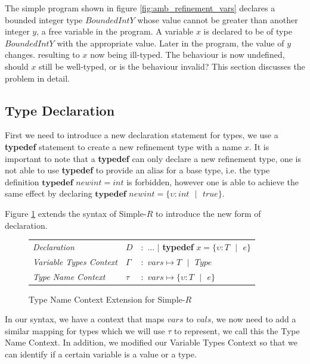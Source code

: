 \documentclass[a4paper,12pt]{report}
\begin{document}
\par
The simple program shown in figure \ref{fig:amb_refinement_vars} declares a 
bounded integer type $BoundedIntY$ whose value cannot be greater than another integer $y$, 
a free variable in the program. A variable $x$ is declared to be of type 
$BoundedIntY$ with the appropriate value. Later in the program, the value of $y$ 
changes. resulting to $x$ now being ill-typed. The behaviour is now undefined, 
should $x$ still be well-typed, or is the behaviour invalid? This section 
discusses the problem in detail. 

\subsection{Type Declaration}
First we need to introduce a new declaration statement for types, 
we use a \textbf{typedef} statement to create a 
new refinement type with a name $x$. It is 
important to note that a \textbf{typedef} can only declare a new refinement type, one is 
not able to use \textbf{typedef} to provide an alias for a base type, i.e. the type 
definition $\textbf{typedef } newint = int$ is forbidden, however one is able to achieve the 
same effect by declaring $\textbf{typedef }newint = \{\upsilon : int\text{ }|\text{ }true\}$.

\par
Figure \ref{fig:typedef-extend} extends the syntax of Simple-$R$ to introduce 
the new form of declaration.
\begin{figure}[H]
  \begin{center}
    \begin{tabular} {l l l}
      \textit{Declaration} & $D$ & $:$ ... $|$ \textbf{typedef }$x = \{\upsilon : T\text{ }|\text{ }e\}$\\
      \textit{Variable Types Context} & $\Gamma$& $:$ $vars \mapsto T\text{ }|\text{ }Type$\\
      \textit{Type Name Context} & $\tau$& $:$ $vars \mapsto \{\upsilon : T\text{ }|\text{ }e\}$ \\
    \end{tabular}
  \end{center}
  \caption{Type Name Context Extension for Simple-$R$}
  \label{fig:typedef-extend}
\end{figure}

\par
In our syntax, we have a context that maps $vars$ to $vals$, we now need to 
add a similar mapping for types which we will use $\tau$ to represent, we call this 
the Type Name Context. In addition, we modified our Variable Types Context 
so that we can identify if a certain variable is a value or a type. 
\end{document}
